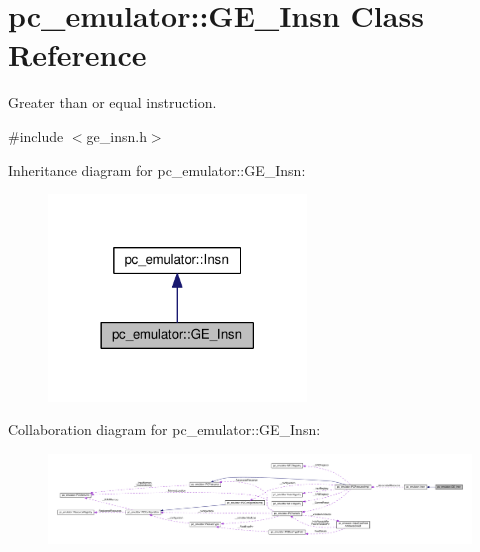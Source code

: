\hypertarget{classpc__emulator_1_1GE__Insn}{}\section{pc\+\_\+emulator\+:\+:G\+E\+\_\+\+Insn Class Reference}
\label{classpc__emulator_1_1GE__Insn}


Greater than or equal instruction.  




{\ttfamily \#include $<$ge\+\_\+insn.\+h$>$}



Inheritance diagram for pc\+\_\+emulator\+:\+:G\+E\+\_\+\+Insn\+:
\nopagebreak
\begin{figure}[H]
\begin{center}
\leavevmode
\includegraphics[width=194pt]{classpc__emulator_1_1GE__Insn__inherit__graph}
\end{center}
\end{figure}


Collaboration diagram for pc\+\_\+emulator\+:\+:G\+E\+\_\+\+Insn\+:
\nopagebreak
\begin{figure}[H]
\begin{center}
\leavevmode
\includegraphics[width=350pt]{classpc__emulator_1_1GE__Insn__coll__graph}
\end{center}
\end{figure}
